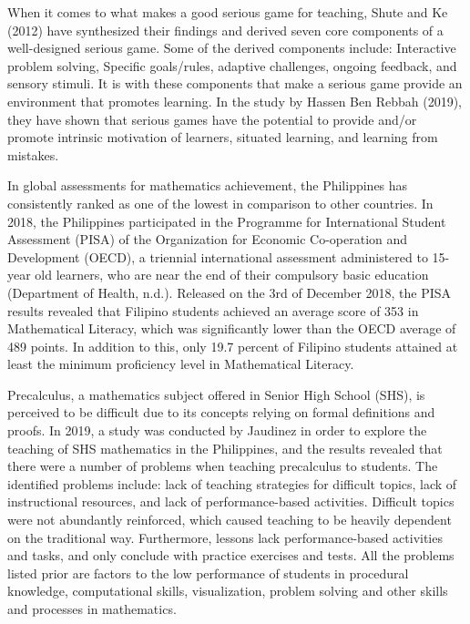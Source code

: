 When it comes to what makes a good serious game for teaching, Shute and Ke (2012) have synthesized their findings and derived seven core components of a well-designed serious game. Some of the derived components include:  Interactive problem solving, Specific goals/rules, adaptive challenges, ongoing feedback, and sensory stimuli. It is with these components that make a serious game provide an environment that promotes learning. In the study by Hassen Ben Rebbah (2019), they have shown that serious games have the potential to provide and/or promote intrinsic motivation of learners, situated learning, and learning from mistakes.

In global assessments for mathematics achievement, the Philippines has consistently ranked as one of the lowest in comparison to other countries. In 2018, the Philippines participated in the Programme for International Student Assessment (PISA) of the Organization for Economic Co-operation and Development (OECD), a triennial international assessment administered to 15-year old  learners, who are near the end of their compulsory basic education (Department of Health, n.d.). Released on the 3rd of December 2018, the PISA results revealed that Filipino students achieved an average score of 353 in Mathematical Literacy, which was significantly lower than the OECD average of 489 points. In addition to this, only 19.7 percent of Filipino students attained at least the minimum proficiency level in Mathematical Literacy.

Precalculus, a mathematics subject offered in Senior High School (SHS), is perceived to be difficult due to its concepts relying on formal definitions and proofs. In 2019, a study was conducted by Jaudinez in order to explore the teaching of SHS mathematics in the Philippines, and the results revealed that there were a number of problems when teaching precalculus to students. The identified problems include: lack of teaching strategies for difficult topics, lack of instructional resources, and lack of performance-based activities. Difficult topics were not abundantly reinforced, which caused teaching to be heavily dependent on the traditional way. Furthermore, lessons lack performance-based activities and tasks, and only conclude with practice exercises and tests. All the problems listed prior are factors to the low performance of students in procedural knowledge, computational skills, visualization, problem solving and other skills and processes in mathematics.

